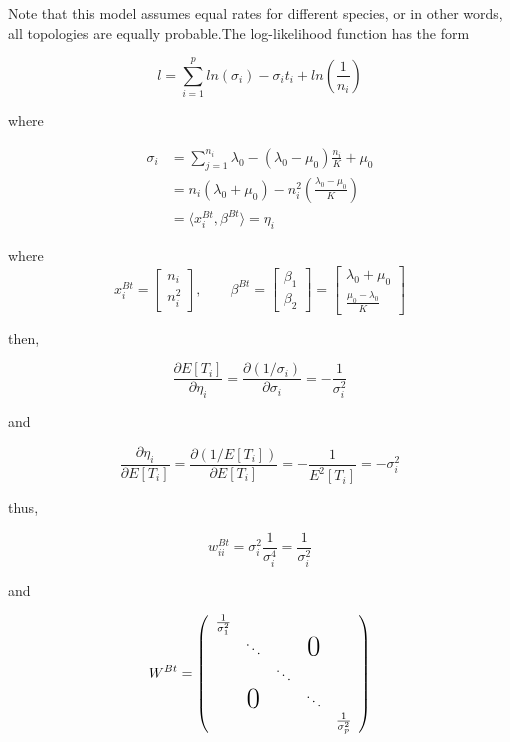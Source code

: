 Note that this model assumes equal rates for different species, or in other words, all topologies are equally probable.The log-likelihood function has the form 

$$  l = \sum_{i=1}^p ln(\sigma_i) - \sigma_i t_i + ln\left(\frac{1}{n_i}\right) $$

where 

\begin{equation}
\begin{aligned}
 \sigma_i & = \sum_{j=1}^{n_i}  \lambda_0 - (\lambda_0 - \mu_0)\frac{n_i}{K} + \mu_0 \\
 		& = n_i(\lambda_0 + \mu_0) - n_i^2\left(\frac{\lambda_0-\mu_0}{K}\right) \\
 		& = \langle x_i^{Bt}, \beta^{Bt} \rangle = \eta_i \end{aligned} \end{equation}
 		
 	
 where
$$ 
 x_i^{Bt}=
  \begin{bmatrix}
    n_i \\
   n_i^2
  \end{bmatrix}, \qquad \beta^{Bt}=
  \begin{bmatrix}
    \beta_1 \\
   \beta_2
  \end{bmatrix} =   \begin{bmatrix}
    \lambda_0+\mu_0\\
   \frac{\mu_0-\lambda_0}{K}
  \end{bmatrix}
$$ 

then, 

$$ \frac{\partial E[T_i]}{\partial \eta_i} = \frac{\partial (1/ \sigma_i)}{\partial \sigma_i} = -\frac{1}{\sigma_i^2}$$

and

$$ \frac{\partial \eta_i}{\partial E[T_i]} = \frac{\partial (1/E[T_i])}{\partial E[T_i]} = -\frac{1}{E^2[T_i]} = -\sigma_i^2 $$

thus, 

$$ w_{ii}^{Bt} = \sigma_i^2 \frac{1}{\sigma_i^4} = \frac{1}{\sigma_i^2} $$ 

and

\[
W^{Bt} = \left(
 \begin{array}{ccccc}
   \frac{1}{\sigma_1^2}\\
    & \ddots & & \text{\huge0}\\
    & & \ddots\\
    & \text{\huge0} & & \ddots\\
    & & & & \frac{1}{\sigma_p^2}
 \end{array}
\right)
\]

